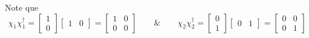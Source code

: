 Note que 
    \begin{equation*}
        \chi_{1}\chi^{\dagger}_{1} = 
        \begin{bmatrix}
            1 \\ 0 
        \end{bmatrix}
        \begin{bmatrix}
            1 & 0
        \end{bmatrix} = 
        \begin{bmatrix}
            1 & 0 \\
            0 & 0
        \end{bmatrix} \qquad \& \qquad 
        \chi_{2}\chi^{\dagger}_{2} = 
        \begin{bmatrix}
            0 \\ 1 
        \end{bmatrix}
        \begin{bmatrix}
            0 & 1
        \end{bmatrix} = 
        \begin{bmatrix}
            0 & 0 \\
            0 & 1
        \end{bmatrix}
    \end{equation*}


